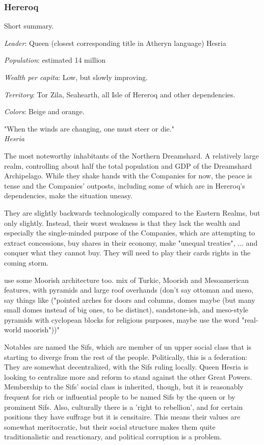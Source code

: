 \subsubsection{Hereroq}


Short summary.


\textit{Leader}: Queen (closest corresponding title in Atheryn language) Hesria

\textit{Population}: estimated 14 million

\textit{Wealth per capita}: Low, but slowly improving.

\textit{Territory}: Tor Zila, Seahearth, all Isle of Hereroq and other dependencies.
    
\textit{Colors}: Beige and orange.


\begin{rpg-quotebox}
    "When the winds are changing, one must steer or die." \\ \textendash \textit{Hesria}
\end{rpg-quotebox}


The most noteworthy inhabitants of the Northern Dreamshard. A relatively large realm, controlling about half the total population and GDP of the Dreamshard Archipelago. While they shake hands with the Companies for now, the peace is tense and the Companies' outposts, including some of which are in Hereroq's dependencies, make the situation uneasy.

They are slightly backwards technologically compared to the Eastern Realms, but only slightly. Instead, their worst weakness is that they lack the wealth and especially the single-minded purpose of the Companies, which are attempting to extract concessions, buy shares in their economy, make "unequal treaties", ... and conquer what they cannot buy. They will need to play their cards rights in the coming storm. 

use some Moorish architecture too. mix of Turkic, Moorish and Mesoamerican features, with pyramids and large roof overhands (don't say ottoman and meso, say things like ("pointed arches for doors and columns, domes maybe (but many small domes instead of big ones, to be distinct), sandstone-ish, and meso-style pyramids with cyclopean blocks for religious purposes, maybe use the word "real-world moorish"))"

Notables are named the Sifs, which are member of un upper social class that is starting to diverge from the rest of the people. Politically, this is a federation: They are somewhat decentralized, with the Sifs ruling locally. Queen Hesria is looking to centralize more and reform to stand against the other Great Powers. Membership to the Sifs' social class is inherited, though, but it is reasonably frequent for rich or influential people to be named Sifs by the queen or by prominent Sifs. Also, culturally there is a 'right to rebellion', and for certain positions they have suffrage but it is censitaire. This means their values are somewhat meritocratic, but their social structure makes them quite traditionalistic and reactionary, and political corruption is a problem.

